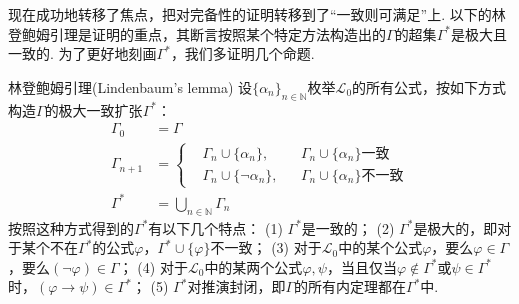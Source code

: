 \documentclass[main.tex]{subfiles}
\begin{document}
现在成功地转移了焦点，把对完备性的证明转移到了“一致则可满足”上. 以下的林登鲍姆引理是证明的重点，其断言按照某个特定方法构造出的\(\Gamma\)的超集\(\Gamma^*\)是极大且一致的. 为了更好地刻画\(\Gamma^*\)，我们多证明几个命题.

\begin{lemma}{林登鲍姆引理(Lindenbaum's lemma)}
    设\(\{\alpha_n\}_{n \in \mathbb{N}}\)枚举\(\mathcal{L}_0\)的所有公式，按如下方式构造\(\Gamma\)的极大一致扩张\(\Gamma^*\)：
    \begin{align*}
        \Gamma_0 &= \Gamma \\
        \Gamma_{n+1} &= \left\{ \begin{aligned} & \Gamma_n \cup \{\alpha_n\}, &&\Gamma_n \cup \{\alpha_n\}\mbox{一致} \\ & \Gamma_n \cup \{\neg \alpha_n\}, &&\Gamma_n \cup \{\alpha_n\}\mbox{不一致}\end{aligned} \right. \\
        \Gamma^* &= \bigcup_{n \in \mathbb{N}} \Gamma_n
    \end{align*}
    按照这种方式得到的\(\Gamma^*\)有以下几个特点：\newline
    (1) \(\Gamma^*\)是一致的；\newline
    (2) \(\Gamma^*\)是极大的，即对于某个不在\(\Gamma^*\)的公式\(\varphi\)，\(\Gamma^* \cup \{\varphi\}\)不一致；\newline
    (3) 对于\(\mathcal{L}_0\)中的某个公式\(\varphi\)，要么\(\varphi \in \Gamma\)，要么\((\neg \varphi) \in \Gamma\)；\newline
    (4) 对于\(\mathcal{L}_0\)中的某两个公式\(\varphi, \psi\)，当且仅当\(\varphi \not \in \Gamma^*\)或\(\psi \in \Gamma^*\)时，\((\varphi \to \psi) \in \Gamma^*\)；\newline
    (5) \(\Gamma^*\)对推演封闭，即\(\Gamma\)的所有内定理都在\(\Gamma^*\)中.
\end{lemma}
\end{document}
